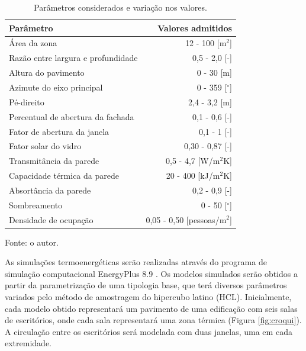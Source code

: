 \documentclass[brazil,hardcopy,openany,a5paper]{ufscthesis}
\begin{document}
		\begin{table}[h]
			\centering
			\caption{Parâmetros considerados e variação nos valores.}
			\label{table:parametros}
			\begin{tabular}{|l |r |}
				\hline
				\textbf{Parâmetro} & \textbf{Valores admitidos} \\
				\hline
				Área da zona & 12 - 100 [m$^2$] \\
				\hline
				Razão entre largura e profundidade & 0,5 - 2,0 [-] \\
				\hline
				Altura do pavimento & 0 - 30 [m] \\
				\hline 
				Azimute do eixo principal & 0 - 359 [$^{\circ}$] \\
				\hline 
				Pé-direito & 2,4 - 3,2 [m] \\
				\hline 
				Percentual de abertura da fachada & 0,1 - 0,6 [-] \\
				\hline 
				Fator de abertura da janela & 0,1 - 1 [-] \\
				\hline 
				Fator solar do vidro & 0,30 - 0,87 [-] \\
				\hline 
				Transmitância da parede & 0,5 - 4,7 [W/m$^2$K] \\
				\hline 
				Capacidade térmica da parede & 20 - 400 [kJ/m$^2$K] \\
				\hline 
				Absortância da parede & 0,2 - 0,9 [-] \\
				\hline 
				Sombreamento & 0 - 50 [$^{\circ}$] \\
				\hline 
				Densidade de ocupação & 0,05 - 0,50 [pessoas/m$^2$] \\
				\hline 
			\end{tabular}
			\begin{flushleft}
				Fonte: o autor.
			\end{flushleft}				
		\end{table}

		As simulações termoenergéticas serão realizadas através do programa de simulação computacional EnergyPlus 8.9 \cite{EnergyPlus2018}. Os modelos simulados serão obtidos a partir da parametrização de uma tipologia base, que terá diversos parâmetros variados pelo método de amostragem do hipercubo latino (HCL). Inicialmente, cada modelo obtido representará um pavimento de uma edificação com seis salas de escritórios, onde cada sala representará uma zona térmica (Figura \ref{fig:croqui}). A circulação entre os escritórios será modelada com duas janelas, uma em cada extremidade.
		
\end{document}
